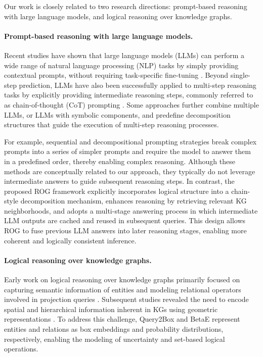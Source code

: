\documentclass[11pt]{article}
\begin{document}
Our work is closely related to two research directions: prompt-based reasoning with large language models, and logical reasoning over knowledge graphs.

\paragraph{Prompt-based reasoning with large language models.}
Recent studies have shown that large language models (LLMs) can perform a wide range of natural language processing (NLP) tasks by simply providing contextual prompts, without requiring task-specific fine-tuning \citep{wu2024power}.
Beyond single-step prediction, LLMs have also been successfully applied to multi-step reasoning tasks by explicitly providing intermediate reasoning steps, commonly referred to as chain-of-thought (CoT) prompting \citep{wei2022chain}.
Some approaches \citep{creswell2022selection, gao2023pal, yang2024harnessing, yang2024can, xiong2025deliberate} further combine multiple LLMs, or LLMs with symbolic components, and predefine decomposition structures that guide the execution of multi-step reasoning processes.

For example, sequential and decompositional prompting strategies \citep{zhou2022least, khot2022decomposed, wang2022self, yao2023tree} break complex prompts into a series of simpler prompts and require the model to answer them in a predefined order, thereby enabling complex reasoning.
Although these methods are conceptually related to our approach, they typically do not leverage intermediate answers to guide subsequent reasoning steps.
In contrast, the proposed ROG framework explicitly incorporates logical structure into a chain-style decomposition mechanism, enhances reasoning by retrieving relevant KG neighborhoods, and adopts a multi-stage answering process in which intermediate LLM outputs are cached and reused in subsequent queries.
This design allows ROG to fuse previous LLM answers into later reasoning stages, enabling more coherent and logically consistent inference.

\paragraph{Logical reasoning over knowledge graphs.}
Early work on logical reasoning over knowledge graphs primarily focused on capturing semantic information of entities and modeling relational operators involved in projection queries \citep{nickel2011rescal, bordes2013translating}.
Subsequent studies revealed the need to encode spatial and hierarchical information inherent in KGs using geometric representations \citep{nickel2017poincare}.
To address this challenge, Query2Box \citep{ren2020query2box} and BetaE \citep{ren2020beta} represent entities and relations as box embeddings and probability distributions, respectively, enabling the modeling of uncertainty and set-based logical operations.
\end{document}
